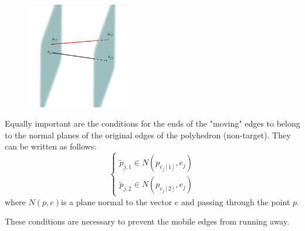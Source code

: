\documentclass[11pt,fleqn,a4paper]{scrartcl}
\begin{document}
\begin{figure}

\includegraphics[width=0.4\textwidth]{innormalplane.png}
\end{figure}
\par
Equally important are the conditions for the ends of the "moving" edges to belong to the normal planes of the original edges of the polyhedron (non-target). They can be written as follows:
$$
\begin{cases}
\tilde{p}_{j,1} \in N(p_{e_{j}[1]},e_{j})\\
\tilde{p}_{j,2} \in N(p_{e_{j}[2]},e_{j})
\end{cases}
$$
where $N(p, e)$is a plane normal to the vector $e$ and passing through the point $p$.\par
These conditions are necessary to prevent the mobile edges from running away.
\end{document}
